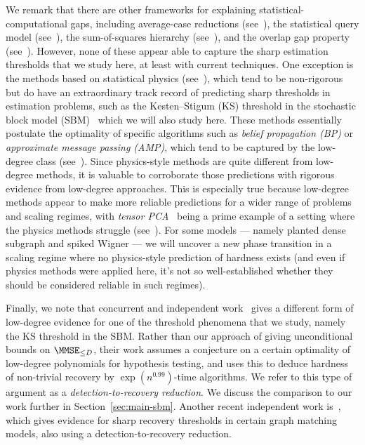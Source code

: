 \documentclass[11pt]{article}
\begin{document}
We remark that there are other frameworks for explaining statistical-computational gaps, including average-case reductions (see~\cite{secret-leakage}), the statistical query model (see~\cite{sq-ld}), the sum-of-squares hierarchy (see~\cite{sos-survey}), and the overlap gap property (see~\cite{ogp-survey}). However, none of these appear able to capture the sharp estimation thresholds that we study here, at least with current techniques. One exception is the methods based on statistical physics (see~\cite{ZF-phys-survey,KZ-phys-notes}), which tend to be non-rigorous but do have an extraordinary track record of predicting sharp thresholds in estimation problems, such as the Kesten--Stigum (KS) threshold in the stochastic block model (SBM)~\cite{decelle} which we will also study here. These methods essentially postulate the optimality of specific algorithms such as \emph{belief propagation (BP)} or \emph{approximate message passing (AMP)}, which tend to be captured by the low-degree class (see~\cite{MW-amp,sos-amp-robustly,fourier-iter,alg-universality}). Since physics-style methods are quite different from low-degree methods, it is valuable to corroborate those predictions with rigorous evidence from low-degree approaches. This is especially true because low-degree methods appear to make more reliable predictions for a wider range of problems and scaling regimes, with \emph{tensor PCA}~\cite{RM-tensor-pca} being a prime example of a setting where the physics methods struggle (see~\cite{kikuchi}). For some models --- namely planted dense subgraph and spiked Wigner --- we will uncover a new phase transition in a scaling regime where no physics-style prediction of hardness exists (and even if physics methods were applied here, it's not so well-established whether they should be considered reliable in such regimes).

Finally, we note that concurrent and independent work~\cite{sbm-reduction} gives a different form of low-degree evidence for one of the threshold phenomena that we study, namely the KS threshold in the SBM. Rather than our approach of giving unconditional bounds on $\MMSE_{\le D}$, their work assumes a conjecture on a certain optimality of low-degree polynomials for hypothesis testing, and uses this to deduce hardness of non-trivial recovery by $\exp(n^{0.99})$-time algorithms. We refer to this type of argument as a \emph{detection-to-recovery reduction}. We discuss the comparison to our work further in Section~\ref{sec:main-sbm}. Another recent independent work is~\cite{alg-contig}, which gives evidence for sharp recovery thresholds in certain graph matching models, also using a detection-to-recovery reduction.
\end{document}
